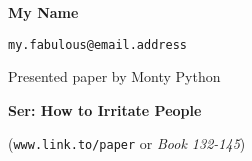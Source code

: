 \documentclass[a4paper,10pt]{article}
\begin{document}
\def\speaker#1#2{                                   
  \centerline{\Large \textbf{#1}}\vskip1pt                
  \centerline{\tt #2} }                                                                          
\def\title#1{\medskip\centerline{\Large \textbf{#1}}}
\def\author#1{\smallskip\centerline{Presented paper by #1}}                                                       
\def\source#1{\smallskip\centerline{(#1)}}
\def\endtitle{\par\medskip}
\newenvironment{definition}{\stepcounter{Defnum}\par\textbf{Definition \arabic{Defnum}.}} {}
\newenvironment{theorem}{\stepcounter{Defnum}\par\textbf{Theorem \arabic{Defnum}.}\it}{}
\newenvironment{lemma}{\stepcounter{Defnum}\par\textbf{Lemma \arabic{Defnum}.}\it}{}
\newenvironment{exercise}{\stepcounter{Defnum}\par\textbf{Exercise \arabic{Defnum}.}\it}{}
\newenvironment{observation}{\stepcounter{Defnum}\par\textbf{Observation \arabic{Defnum}.}\it}{}
\newenvironment{corollary}{\stepcounter{Defnum}\par\textbf{Corollary \arabic{Defnum}.}\it}{}
\newenvironment{conjecture}{\stepcounter{Defnum}\par\textbf{Conjecture \arabic{Defnum}.}\it}{}
\setlength{\parindent}{0pt}
\setlength{\parskip}{0.5 em}
\def\subsection#1{\par Not good idea. \smallskip}
\def\section#1{\par\medskip\centerline{\bf #1}\smallskip}
\def\cite#1{Don't use cite.}


\speaker{My Name}{my.fabulous@email.address}
\author{Monty Python}%
\title{Ser: How to Irritate People}
\source{\texttt{www.link.to/paper} or \textit{Book 132-145}}
\endtitle
\end{document}
